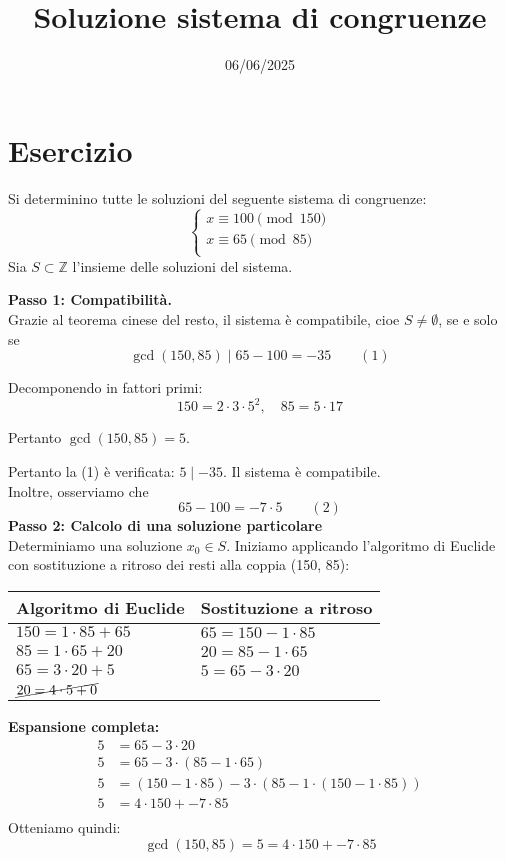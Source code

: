 \documentclass[12pt]{article}
\begin{document}
\title{Soluzione sistema di congruenze}
\date{06/06/2025}
\maketitle
\section*{Esercizio}
Si determinino tutte le soluzioni del seguente sistema di congruenze:
\[
\begin{cases}
x \equiv 100 \pmod{150} \\
x \equiv 65 \pmod{85} \\
\end{cases}
\]
Sia $S \subset \mathbb{Z}$ l'insieme delle soluzioni del sistema.

\textbf{Passo 1: Compatibilità.} \\ 
Grazie al teorema cinese del resto, il sistema è compatibile, cioe $S \neq \emptyset$, se e solo se
$$\gcd(150, 85) \mid 65 - 100 = -35 \qquad (1)$$

Decomponendo in fattori primi:
$$150 = 2 \cdot 3 \cdot 5^{2}, \quad 85 = 5 \cdot 17$$

Pertanto $\gcd(150, 85) = 5$.

Pertanto la (1) è verificata: $5 \mid -35$. Il sistema è compatibile.\\
Inoltre, osserviamo che $$65 - 100 = -7 \cdot 5 \qquad (2)$$
\textbf{Passo 2: Calcolo di una soluzione particolare} \\
Determiniamo una soluzione $x_0 \in S$.
Iniziamo applicando l'algoritmo di Euclide con sostituzione a ritroso dei resti alla coppia (150, 85):
\begin{center}
\setlength{\arrayrulewidth}{0.5pt}
\begin{tabular}{|p{5cm}|p{9cm}|}
\hline
\textbf{Algoritmo di Euclide} & \textbf{Sostituzione a ritroso} \\
\hline
$150 = 1 \cdot  85 + 65$ & $65 = 150 - 1 \cdot  85$ \\
\hline
$85 = 1 \cdot  65 + 20$ & $20 = 85 - 1 \cdot  65$ \\
\hline
$65 = 3 \cdot  20 + 5$ & $5 = 65 - 3 \cdot  20$ \\
\hline
$\cancel{20 = 4 \cdot  5 + 0}$ & \\
\hline
\end{tabular}
\end{center}
\textbf{Espansione completa:}
\begin{align*}
5 &= 65 - 3\cdot20\\
5 &= 65 - 3\cdot(85 - 1\cdot65)\\
5 &= (150 - 1\cdot85) - 3\cdot(85 - 1\cdot(150 - 1\cdot85))\\
5 &= 4\cdot150 + -7\cdot85\\
\end{align*}
Otteniamo quindi: $$\gcd(150, 85) = 5 = 4 \cdot 150 + -7 \cdot 85$$
\end{document}
